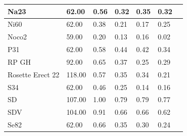 \documentclass[ngerman,onecolumn,bibliography=totocnumbered]{scrreprt}
\begin{document}
\begin{table}[]
\begin{tabular}{|l|l|l|l|l|l|l|}
Na23  & 62.00  & 0.56  & 0.32  & 0.35  & 0.32 \\ \hline
Ni60  & 62.00  & 0.38  & 0.21  & 0.17  & 0.25 \\ \hline
Noco2  & 59.00  & 0.20  & 0.13  & 0.16  & 0.02 \\ \hline
P31  & 62.00  & 0.58  & 0.44  & 0.42  & 0.34 \\ \hline
RP GH  & 92.00  & 0.65  & 0.37  & 0.25  & 0.29 \\ \hline
Rosette Erect 22  & 118.00  & 0.57  & 0.35  & 0.34  & 0.21 \\ \hline
S34  & 62.00  & 0.46  & 0.25  & 0.14  & 0.16 \\ \hline
SD  & 107.00  & 1.00  & 0.79  & 0.79  & 0.77 \\ \hline
SDV  & 104.00  & 0.91  & 0.66  & 0.66  & 0.62 \\ \hline
Se82  & 62.00  & 0.66  & 0.35  & 0.30  & 0.24 \\ \hline
\end{tabular}
\end{table}
\end{document}
